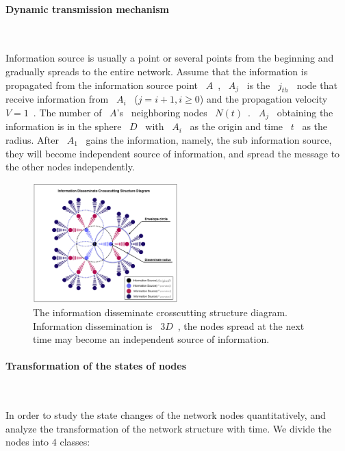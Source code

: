 \documentclass[a4paper,11pt]{article}
\begin{document}
\paragraph{Dynamic transmission mechanism}
\textrm{\\}
\par Information source is usually a point or several points from the beginning and gradually spreads to the entire network. Assume that the information is propagated from the information source point ~$A$~, ~$A_j$~ is the ~$j_{th}$~ node that receive information from ~$A_i$~ ($j=i+1,i\geqslant 0$) and the propagation velocity ~$V=1$~. The number of ~$A$'s~ neighboring nodes ~$N(t)$~. ~$A_j$~ obtaining the information is in the sphere ~$D$~ with ~$A_i$~ as the origin and time ~$t$~ as the radius. After ~$A_1$~ gains the information, namely, the sub information source, they will become independent source of information, and spread the message to the other nodes independently.





\begin{figure}[h]%
    \centering 
    \includegraphics[width=0.5\textwidth]{./Pic/Information_Disseminate_Crosscutting_Structure_Diagram.png}
    \caption{The information disseminate crosscutting structure diagram. Information dissemination is ~$3D$~, the nodes spread at the next time may become an independent source of information.}
    \label{fig:Information_Disseminate_Crosscutting_Structure_Diagram}  
\end{figure}










\paragraph{Transformation of the states of nodes}
\textrm{\\}
\par In order to study the state changes of the network nodes quantitatively, and analyze the transformation of the network structure with time. We divide the nodes into $4$ classes:
\end{document}
